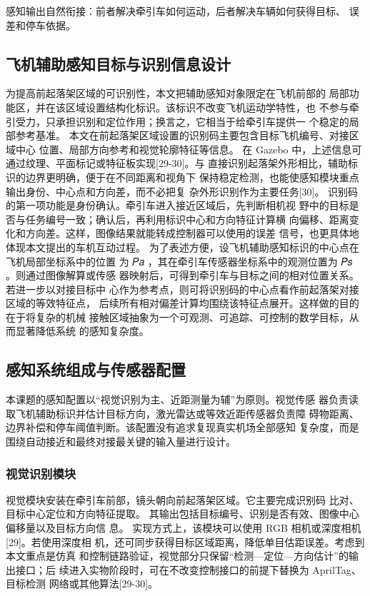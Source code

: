 感知输出自然衔接：前者解决牵引车如何运动，后者解决车辆如何获得目标、
误差和停车依据。
\subsection{飞机辅助感知目标与识别信息设计}
为提高前起落架区域的可识别性，本文把辅助感知对象限定在飞机前部的
局部功能区，并在该区域设置结构化标识。该标识不改变飞机运动学特性，也
不参与牵引受力，只承担识别和定位作用；换言之，它相当于给牵引车提供一
个稳定的局部参考基准。
本文在前起落架区域设置的识别码主要包含目标飞机编号、对接区域中心
位置、局部方向参考和视觉轮廓特征等信息。
在 Gazebo 中，上述信息可通过纹理、平面标记或特征板实现[29-30]。与
直接识别起落架外形相比，辅助标识的边界更明确，便于在不同距离和视角下
保持稳定检测，也能使感知模块重点输出身份、中心点和方向差，而不必把复
杂外形识别作为主要任务[30]。
识别码的第一项功能是身份确认。牵引车进入接近区域后，先判断相机视
野中的目标是否与任务编号一致；确认后，再利用标识中心和方向特征计算横
向偏移、距离变化和方向差。这样，图像结果就能转成控制器可以使用的误差
信号，也更具体地体现本文提出的车机互动过程。
为了表述方便，设飞机辅助感知标识的中心点在飞机局部坐标系中的位置
为 𝑃𝑎 ，其在牵引车传感器坐标系中的观测位置为 𝑃𝑠 。则通过图像解算或传感
器映射后，可得到牵引车与目标之间的相对位置关系。若进一步以对接目标中
心作为参考点，则可将识别码的中心点看作前起落架对接区域的等效特征点，
后续所有相对偏差计算均围绕该特征点展开。这样做的目的在于将复杂的机械
接触区域抽象为一个可观测、可追踪、可控制的数学目标，从而显著降低系统
的感知复杂度。


\subsection{感知系统组成与传感器配置}
本课题的感知配置以“视觉识别为主、近距测量为辅”为原则。视觉传感
器负责读取飞机辅助标识并估计目标方向，激光雷达或等效近距传感器负责障
碍物距离、边界补偿和停车阈值判断。该配置没有追求复现真实机场全部感知
复杂度，而是围绕自动接近和最终对接最关键的输入量进行设计。
\subsubsection{视觉识别模块}







视觉模块安装在牵引车前部，镜头朝向前起落架区域。它主要完成识别码
比对、目标中心定位和方向特征提取。
其输出包括目标编号、识别是否有效、图像中心偏移量以及目标方向信
息。
实现方式上，该模块可以使用 RGB 相机或深度相机[29]。若使用深度相
机，还可同步获得目标区域距离，降低单目估距误差。考虑到本文重点是仿真
和控制链路验证，视觉部分只保留“检测—定位—方向估计”的输出接口；后
续进入实物阶段时，可在不改变控制接口的前提下替换为 AprilTag、目标检测
网络或其他算法[29-30]。
